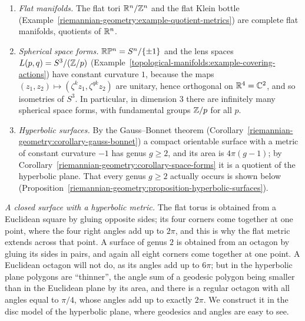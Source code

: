 \begin{example}\label{riemannian-geometry:example-space-forms}
\begin{enumerate}
\item \emph{Flat manifolds.} The flat tori $\mathbb{R}^n/\mathbb{Z}^n$ and the flat Klein bottle (Example~\ref{riemannian-geometry:example-quotient-metrics}) are complete flat manifolds,
quotients of $\mathbb{R}^n$.
\item \emph{Spherical space forms.} $\mathbb{R}\mathbb{P}^n = S^n/\{\pm1\}$ and the lens spaces $L(p, q) = S^3/(\mathbb{Z}/p)$ (Example~\ref{topological-manifolds:example-covering-actions})
have constant curvature $1$, because the maps $(z_1, z_2) \mapsto (\zeta^kz_1, \zeta^{qk}z_2)$ are unitary, hence orthogonal on $\mathbb{R}^4 = \mathbb{C}^2$, and so isometries of
$S^3$. In particular, in dimension $3$ there are infinitely many spherical space forms, with fundamental groups $\mathbb{Z}/p$ for all $p$.
\item \emph{Hyperbolic surfaces.} By the Gauss--Bonnet theorem (Corollary~\ref{riemannian-geometry:corollary-gauss-bonnet}) a compact orientable surface with a metric of
constant curvature $-1$ has genus $g \geq 2$, and its area is $4\pi(g - 1)$; by Corollary~\ref{riemannian-geometry:corollary-space-forms} it is a quotient of the hyperbolic
plane. That every genus $g \geq 2$ actually occurs is shown below (Proposition~\ref{riemannian-geometry:proposition-hyperbolic-surfaces}).
\end{enumerate}
\end{example}

\emph{A closed surface with a hyperbolic metric.} The flat torus is obtained from a Euclidean square by gluing opposite sides; its four corners come together at one point, where the four
right angles add up to $2\pi$, and this is why the flat metric extends across that point. A surface of genus $2$ is obtained from an octagon by gluing its sides in pairs, and again all eight
corners come together at one point. A Euclidean octagon will not do, as its angles add up to $6\pi$; but in the hyperbolic plane polygons are ``thinner'', the angle sum of a geodesic polygon
being smaller than in the Euclidean plane by its area, and there is a regular octagon with all angles equal to $\pi/4$, whose angles add up to exactly $2\pi$. We construct it in the disc model of
the hyperbolic plane, where geodesics and angles are easy to see.

